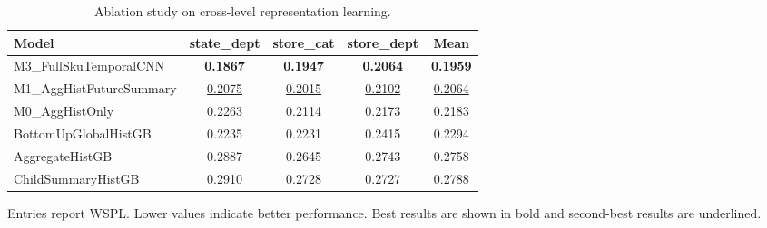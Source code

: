 \begin{table}[H]
\centering
\caption{Ablation study on cross-level representation learning.}
\label{tab:ablation}
\begin{threeparttable}
\begin{tabular}{lcccc}
\toprule
Model & state\_dept & store\_cat & store\_dept & Mean \\
\midrule
M3\_FullSkuTemporalCNN & \textbf{0.1867} & \textbf{0.1947} & \textbf{0.2064} & \textbf{0.1959} \\
M1\_AggHistFutureSummary & \underline{0.2075} & \underline{0.2015} & \underline{0.2102} & \underline{0.2064} \\
M0\_AggHistOnly & 0.2263 & 0.2114 & 0.2173 & 0.2183 \\
BottomUpGlobalHistGB & 0.2235 & 0.2231 & 0.2415 & 0.2294 \\
AggregateHistGB & 0.2887 & 0.2645 & 0.2743 & 0.2758 \\
ChildSummaryHistGB & 0.2910 & 0.2728 & 0.2727 & 0.2788 \\
\bottomrule
\end{tabular}
\begin{tablenotes}
\footnotesize \item Entries report WSPL. Lower values indicate better performance. Best results are shown in bold and second-best results are underlined.
\end{tablenotes}
\end{threeparttable}
\end{table}
